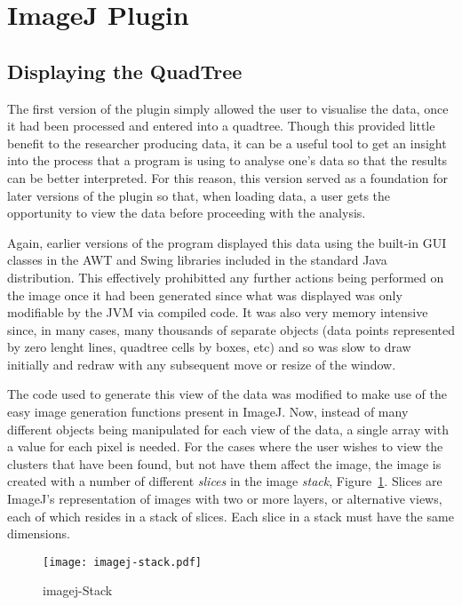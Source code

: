 
\section{ImageJ Plugin}
\label{sec:imagej_plugin}

\cite{imagejapi}

\subsection{Displaying the QuadTree}
\label{sub:displaying_the_quadtree}

The first version of the plugin simply allowed the user to visualise the data,
once it had been processed and entered into a quadtree. Though this provided
little benefit to the researcher producing data, it can be a useful tool to get
an insight into the process that a program is using to analyse one's data so
that the results can be better interpreted. For this reason, this version
served as a foundation for later versions of the plugin so that, when loading
data, a user gets the opportunity to view the data before proceeding with the
analysis.

Again, earlier versions of the program displayed this data using the built-in
GUI classes in the AWT and Swing libraries included in the standard Java
distribution. This effectively prohibitted any further actions being performed
on the image once it had been generated since what was displayed was only
modifiable by the JVM via compiled code. It was also very memory intensive
since, in many cases, many thousands of separate objects (data points
represented by zero lenght lines, quadtree cells by boxes, etc) and so was slow
to draw initially and redraw with any subsequent move or resize of the window.

The code used to generate this view of the data was modified to make use of the
easy image generation functions present in ImageJ. Now, instead of many
different objects being manipulated for each view of the data, a single array
with a value for each pixel is needed. For the cases where the user wishes to
view the clusters that have been found, but not have them affect the image, the
image is created with a number of different \emph{slices} in the image
\emph{stack}, Figure~\ref{fig:imagej-stack}. Slices are ImageJ's representation
of images with two or more layers, or alternative views, each of which resides
in a stack of slices. Each slice in a stack must have the same dimensions.

\begin{figure}[tbhp]
	\centering
	\texttt{[image: imagej-stack.pdf]}
	\caption{imagej-Stack}
	\label{fig:imagej-stack}
\end{figure}

